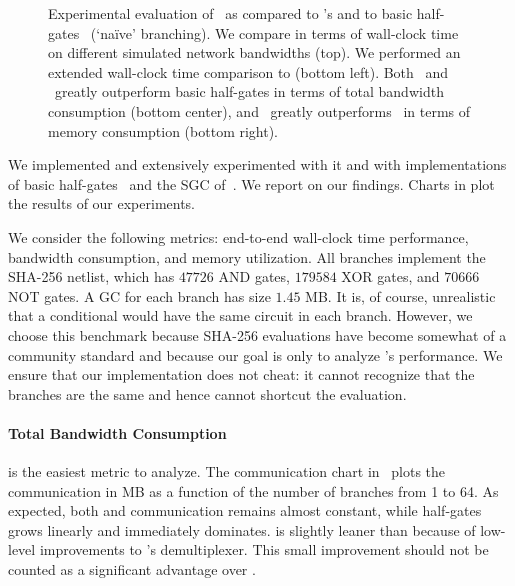 \begin{figure}[t]
\begin{adjustwidth}{-0.13\textwidth}{-0.13\textwidth}
  \end{adjustwidth}
  \caption{%
    Experimental evaluation of \ourschemelong\ as compared to  \HK's
    \stack and to basic half-gates~\cite{EC:ZahRosEva15} (`na\"ive'
    branching).
    We compare in terms of wall-clock time on different simulated network
    bandwidths (top).
    We performed an extended wall-clock time comparison to \stack
    (bottom left).
    Both \ourschemelong\ and \stack\ greatly outperform basic
    half-gates in terms of total bandwidth consumption (bottom
    center), and \ourschemelong\ greatly outperforms \stack\ in terms
    of memory consumption (bottom right).
  }\label{fig:plots}
\end{figure}

We implemented \ourschemelong and extensively experimented with it and
with implementations of basic half-gates~\cite{EC:ZahRosEva15} and the
\stack SGC of~\HK.
We report on our findings.
Charts in  plot the results of our experiments.

We consider  the following metrics: end-to-end wall-clock time
performance, bandwidth consumption, and memory utilization.
All branches implement the SHA-256 netlist, which has $47726$ AND gates,
$179584$ XOR gates, and $70666$ NOT gates.
A GC for each branch has size $1.45$ MB.
It is, of course, unrealistic that a conditional would have the same
circuit in each branch. However, we choose this benchmark because
SHA-256 evaluations have become somewhat of a community standard and because our
goal is only to analyze \ourschemelong's performance.
%
We ensure that our implementation does not cheat: it cannot recognize
that the branches are the same and hence cannot shortcut the evaluation.

\paragraph{Total Bandwidth Consumption}  is the easiest metric to analyze.
The communication chart in~ plots the communication in
MB as a function of the number of branches from 1 to 64.  As expected, both \stack and
\ourschemelong communication remains almost constant, while half-gates
grows linearly and immediately dominates.  \ourschemelong is slightly
leaner than \stack because of low-level improvements to
\ourschemelong's demultiplexer. This small improvement should not be counted
as a significant advantage over \stack.


